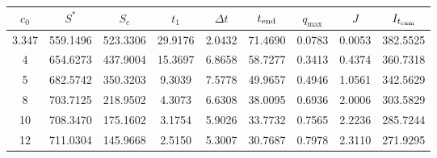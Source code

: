 \begin{tabular}{ccccccccc}
\toprule
$c_0$ & $S^*$ & $S_c$ & $t_1$ & $\Delta t$ & $t_{\rm end}$ & $q_{\max}$ & $J$ & $I_{t_{\rm cum}}$ \\
\midrule
3.347 & 559.1496 & 523.3306 & 29.9176 & 2.0432 & 71.4690 & 0.0783 & 0.0053 & 382.5525 \\
4 & 654.6273 & 437.9004 & 15.3697 & 6.8658 & 58.7277 & 0.3413 & 0.4374 & 360.7318 \\
5 & 682.5742 & 350.3203 & 9.3039 & 7.5778 & 49.9657 & 0.4946 & 1.0561 & 342.5629 \\
8 & 703.7125 & 218.9502 & 4.3073 & 6.6308 & 38.0095 & 0.6936 & 2.0006 & 303.5829 \\
10 & 708.3470 & 175.1602 & 3.1754 & 5.9026 & 33.7732 & 0.7565 & 2.2236 & 285.7244 \\
12 & 711.0304 & 145.9668 & 2.5150 & 5.3007 & 30.7687 & 0.7978 & 2.3110 & 271.9295 \\
\bottomrule
\end{tabular}
